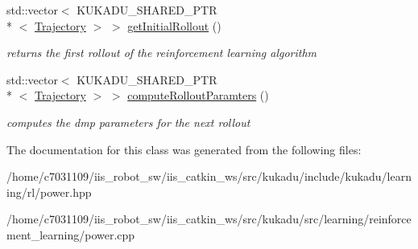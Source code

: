 \begin{DoxyCompactItemize}
\item 
\hypertarget{classkukadu_1_1PoWER_a04171f5169454432c1de5fc04cf49668}{std\-::vector$<$ K\-U\-K\-A\-D\-U\-\_\-\-S\-H\-A\-R\-E\-D\-\_\-\-P\-T\-R\\*
$<$ \hyperlink{classkukadu_1_1Trajectory}{Trajectory} $>$ $>$ \hyperlink{classkukadu_1_1PoWER_a04171f5169454432c1de5fc04cf49668}{get\-Initial\-Rollout} ()}\label{classkukadu_1_1PoWER_a04171f5169454432c1de5fc04cf49668}

\begin{DoxyCompactList}\small\item\em returns the first rollout of the reinforcement learning algorithm \end{DoxyCompactList}\item 
\hypertarget{classkukadu_1_1PoWER_a93d5eb1ddf9a07e1e6d713c71ddf009c}{std\-::vector$<$ K\-U\-K\-A\-D\-U\-\_\-\-S\-H\-A\-R\-E\-D\-\_\-\-P\-T\-R\\*
$<$ \hyperlink{classkukadu_1_1Trajectory}{Trajectory} $>$ $>$ \hyperlink{classkukadu_1_1PoWER_a93d5eb1ddf9a07e1e6d713c71ddf009c}{compute\-Rollout\-Paramters} ()}\label{classkukadu_1_1PoWER_a93d5eb1ddf9a07e1e6d713c71ddf009c}

\begin{DoxyCompactList}\small\item\em computes the dmp parameters for the next rollout \end{DoxyCompactList}\end{DoxyCompactItemize}


The documentation for this class was generated from the following files\-:\begin{DoxyCompactItemize}
\item 
/home/c7031109/iis\-\_\-robot\-\_\-sw/iis\-\_\-catkin\-\_\-ws/src/kukadu/include/kukadu/learning/rl/power.\-hpp\item 
/home/c7031109/iis\-\_\-robot\-\_\-sw/iis\-\_\-catkin\-\_\-ws/src/kukadu/src/learning/reinforcement\-\_\-learning/power.\-cpp\end{DoxyCompactItemize}
